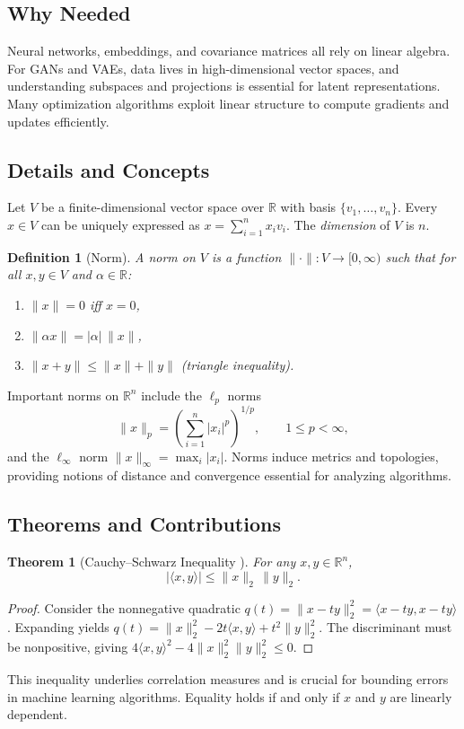 \documentclass[11pt]{book}
\newtheorem{theorem}{Theorem}[chapter]
\newtheorem{definition}{Definition}[chapter]
\begin{document}
\subsection{Why Needed}
Neural networks, embeddings, and covariance matrices all rely on linear algebra. For GANs and VAEs, data lives in high-dimensional vector spaces, and understanding subspaces and projections is essential for latent representations. Many optimization algorithms exploit linear structure to compute gradients and updates efficiently.

\subsection{Details and Concepts}
Let $V$ be a finite-dimensional vector space over $\mathbb{R}$ with basis $\{v_1,\dots,v_n\}$. Every $x\in V$ can be uniquely expressed as $x=\sum_{i=1}^n x_i v_i$. The \emph{dimension} of $V$ is $n$.

\begin{definition}[Norm]
A \emph{norm} on $V$ is a function $\|\cdot\|:V\to[0,\infty)$ such that for all $x,y\in V$ and $\alpha\in\mathbb{R}$:
\begin{enumerate}
    \item $\|x\|=0$ iff $x=0$,
    \item $\|\alpha x\|=|\alpha|\,\|x\|$,
    \item $\|x+y\|\le \|x\|+\|y\|$ (triangle inequality).
\end{enumerate}
\end{definition}
Important norms on $\mathbb{R}^n$ include the $\ell_p$ norms
\begin{equation}
\|x\|_p = \left(\sum_{i=1}^n |x_i|^p\right)^{1/p},\qquad 1\le p<\infty,
\end{equation}
and the $\ell_\infty$ norm $\|x\|_\infty=\max_i|x_i|$. Norms induce metrics and topologies, providing notions of distance and convergence essential for analyzing algorithms.

\subsection{Theorems and Contributions}
\begin{theorem}[Cauchy--Schwarz Inequality \cite{cauchy1821,schwarz1888}]
For any $x,y\in\mathbb{R}^n$,
\begin{equation}
|\langle x,y\rangle|\le \|x\|_2\,\|y\|_2.
\end{equation}
\end{theorem}
\begin{proof}
Consider the nonnegative quadratic $q(t)=\|x-ty\|_2^2=\langle x-ty,x-ty\rangle$. Expanding yields $q(t)=\|x\|_2^2-2t\langle x,y\rangle+t^2\|y\|_2^2$. The discriminant must be nonpositive, giving $4\langle x,y\rangle^2-4\|x\|_2^2\|y\|_2^2\le0$.
\end{proof}
This inequality underlies correlation measures and is crucial for bounding errors in machine learning algorithms. Equality holds if and only if $x$ and $y$ are linearly dependent.
\end{document}

